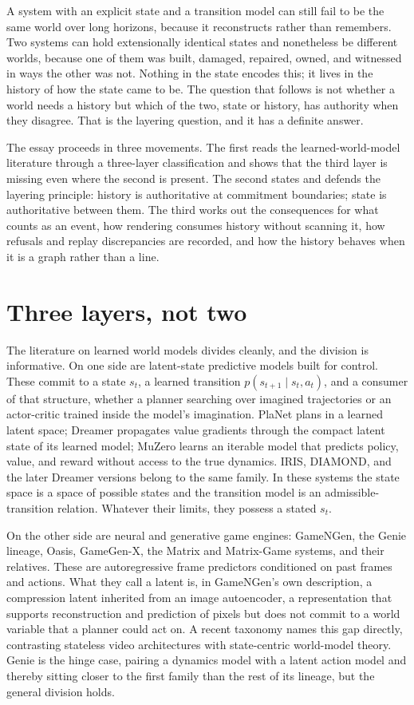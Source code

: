 \documentclass[11pt]{article}
\begin{document}
A system with an explicit state and a transition model can still fail to be the same world over long horizons, because it reconstructs rather than remembers. Two systems can hold extensionally identical states and nonetheless be different worlds, because one of them was built, damaged, repaired, owned, and witnessed in ways the other was not. Nothing in the state encodes this; it lives in the history of how the state came to be. The question that follows is not whether a world needs a history but which of the two, state or history, has authority when they disagree. That is the layering question, and it has a definite answer.

The essay proceeds in three movements. The first reads the learned-world-model literature through a three-layer classification and shows that the third layer is missing even where the second is present. The second states and defends the layering principle: history is authoritative at commitment boundaries; state is authoritative between them. The third works out the consequences for what counts as an event, how rendering consumes history without scanning it, how refusals and replay discrepancies are recorded, and how the history behaves when it is a graph rather than a line.

\section{Three layers, not two}

The literature on learned world models divides cleanly, and the division is informative. On one side are latent-state predictive models built for control. These commit to a state $s_t$, a learned transition $p(s_{t+1} \mid s_t, a_t)$, and a consumer of that structure, whether a planner searching over imagined trajectories or an actor-critic trained inside the model's imagination. PlaNet plans in a learned latent space; Dreamer propagates value gradients through the compact latent state of its learned model; MuZero learns an iterable model that predicts policy, value, and reward without access to the true dynamics. IRIS, DIAMOND, and the later Dreamer versions belong to the same family. In these systems the state space is a space of possible states and the transition model is an admissible-transition relation. Whatever their limits, they possess a stated $s_t$.

On the other side are neural and generative game engines: GameNGen, the Genie lineage, Oasis, GameGen-X, the Matrix and Matrix-Game systems, and their relatives. These are autoregressive frame predictors conditioned on past frames and actions. What they call a latent is, in GameNGen's own description, a compression latent inherited from an image autoencoder, a representation that supports reconstruction and prediction of pixels but does not commit to a world variable that a planner could act on. A recent taxonomy names this gap directly, contrasting stateless video architectures with state-centric world-model theory. Genie is the hinge case, pairing a dynamics model with a latent action model and thereby sitting closer to the first family than the rest of its lineage, but the general division holds.
\end{document}
